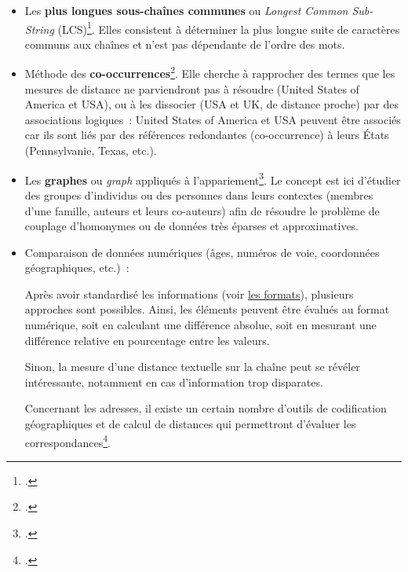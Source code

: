 \documentclass[a4paper,12pt,twoside]{book}
\begin{document}
                \begin{itemize}
                \setlength\itemsep{0.8em}
                    \item Les \textbf{plus longues sous-chaînes communes} ou \textit{Longest Common Sub-String} (LCS)\footcite{LongueSouschaineCommune2021}. Elles consistent à déterminer la plus longue suite de caractères communs aux chaînes et n'est pas dépendante de l'ordre des mots.
                    
                    \item Méthode des \og{}\textbf{co-occurrences}\fg{}\footcite{ananthakrishnaEliminatingFuzzyDuplicates2002a}. Elle cherche à rapprocher des termes que les mesures de distance ne parviendront pas à résoudre (\og{}United States of America\fg{} et \og{}USA\fg{}), ou à les dissocier (\og{}USA\fg{} et \og{}UK\fg{}, de distance proche) par des associations logiques~: \og{}United States of America\fg{} et \og{}USA\fg{} peuvent être associés car ils sont liés par des références redondantes (\og{}co-occurrence\fg{}) à leurs États (Pennsylvanie, Texas, etc.).
                    \label{graph}
                    \item Les \textbf{graphes} ou \textit{graph} appliqués à l'appariement\footcites{GraphMatchingMethod,onGroupLinkage2007,onSocialNetworkAnalysis2008}. Le concept est ici d'étudier des groupes d'individus ou des personnes dans leurs contextes (membres d'une famille, auteurs et leurs co-auteurs) afin de résoudre le problème de couplage d'homonymes ou de données très éparses et approximatives.
                    
                    \item Comparaison de données numériques (âges, numéros de voie, coordonnées géographiques, etc.)~:
                    
                    Après avoir standardisé les informations (voir \hyperref[format]{les formats}), plusieurs approches sont possibles. Ainsi, les éléments peuvent être évalués au format numérique, soit en calculant une différence absolue, soit en mesurant une différence relative en pourcentage entre les valeurs.
                    
                    Sinon, la mesure d'une distance textuelle sur la chaîne peut se révéler intéressante, notamment en cas d'information trop disparates.
                    
                    Concernant les adresses, il existe un certain nombre d'outils de codification géographiques et de calcul de distances qui permettront d'évaluer les correspondances\footcite[][p.~124 et pp.~208-211]{christenDataMatchingConcepts2012}.
                \end{itemize}
                \newpage
                
\end{document}

